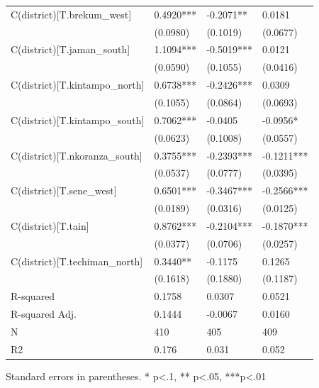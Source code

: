 \begin{table}
\begin{center}
\begin{tabular}{llll}
C(district)[T.brekum\_west]    & 0.4920***          & -0.2071**          & 0.0181                \\
                               & (0.0980)           & (0.1019)           & (0.0677)              \\
C(district)[T.jaman\_south]    & 1.1094***          & -0.5019***         & 0.0121                \\
                               & (0.0590)           & (0.1055)           & (0.0416)              \\
C(district)[T.kintampo\_north] & 0.6738***          & -0.2426***         & 0.0309                \\
                               & (0.1055)           & (0.0864)           & (0.0693)              \\
C(district)[T.kintampo\_south] & 0.7062***          & -0.0405            & -0.0956*              \\
                               & (0.0623)           & (0.1008)           & (0.0557)              \\
C(district)[T.nkoranza\_south] & 0.3755***          & -0.2393***         & -0.1211***            \\
                               & (0.0537)           & (0.0777)           & (0.0395)              \\
C(district)[T.sene\_west]      & 0.6501***          & -0.3467***         & -0.2566***            \\
                               & (0.0189)           & (0.0316)           & (0.0125)              \\
C(district)[T.tain]            & 0.8762***          & -0.2104***         & -0.1870***            \\
                               & (0.0377)           & (0.0706)           & (0.0257)              \\
C(district)[T.techiman\_north] & 0.3440**           & -0.1175            & 0.1265                \\
                               & (0.1618)           & (0.1880)           & (0.1187)              \\
R-squared                      & 0.1758             & 0.0307             & 0.0521                \\
R-squared Adj.                 & 0.1444             & -0.0067            & 0.0160                \\
N                              & 410                & 405                & 409                   \\
R2                             & 0.176              & 0.031              & 0.052                 \\
\hline
\end{tabular}
\end{center}
\end{table}
\bigskip
Standard errors in parentheses. \newline 
* p<.1, ** p<.05, ***p<.01